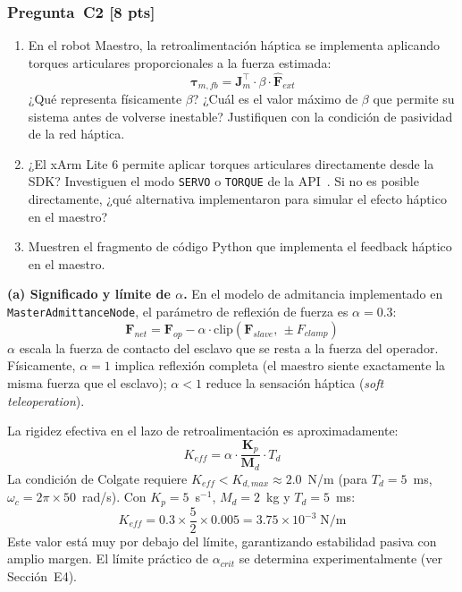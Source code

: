 \documentclass[journal,10pt,twoside]{IEEEtran}
\newcommand{\pts}[1]{\textcolor{tec_red}{\textbf{[#1 pts]}}}
\begin{document}
\subsubsection*{Pregunta~C2 \pts{8}}
\begin{enumerate}[label=(\alph*)]
  \item En el robot Maestro, la retroalimentación háptica se implementa
        aplicando torques articulares proporcionales a la fuerza estimada:
        \[
          \bm{\tau}_{m,fb} = \bm{J}_m^\top \cdot \beta \cdot \hat{\bm{F}}_{ext}
        \]
        ¿Qué representa físicamente $\beta$?
        ¿Cuál es el valor máximo de $\beta$ que permite su sistema
        antes de volverse inestable?
        Justifiquen con la condición de pasividad de la red háptica.
  \item ¿El xArm Lite 6 permite aplicar torques articulares directamente
        desde la SDK? Investiguen el modo \texttt{SERVO} o
        \texttt{TORQUE} de la API~\cite{xarm_github}.
        Si no es posible directamente, ¿qué alternativa implementaron
        para simular el efecto háptico en el maestro?
  \item Muestren el fragmento de código Python que implementa el
        feedback háptico en el maestro.
\end{enumerate}

\textbf{(a) Significado y límite de $\alpha$.}
En el modelo de admitancia implementado en \texttt{MasterAdmittanceNode},
el parámetro de reflexión de fuerza es $\alpha = 0.3$:
\[
  \bm{F}_{net} = \bm{F}_{op} - \alpha \cdot \text{clip}(\bm{F}_{slave},\,
  \pm F_{clamp})
\]
$\alpha$ escala la fuerza de contacto del esclavo que se resta a la
fuerza del operador. Físicamente, $\alpha = 1$ implica reflexión
completa (el maestro siente exactamente la misma fuerza que el esclavo);
$\alpha < 1$ reduce la sensación háptica (\textit{soft teleoperation}).

La rigidez efectiva en el lazo de retroalimentación es aproximadamente:
\[
  K_{eff} = \alpha \cdot \frac{\bm{K}_p}{\bm{M}_d} \cdot T_d
\]
La condición de Colgate requiere $K_{eff} < K_{d,max} \approx 2.0$~N/m
(para $T_d = 5$~ms, $\omega_c = 2\pi\times50$~rad/s). Con
$K_p = 5$~s$^{-1}$, $M_d = 2$~kg y $T_d = 5$~ms:
\[
  K_{eff} = 0.3 \times \frac{5}{2} \times 0.005 = 3.75 \times 10^{-3} \;\text{N/m}
\]
Este valor está muy por debajo del límite, garantizando estabilidad
pasiva con amplio margen. El límite práctico de $\alpha_{crit}$ se
determina experimentalmente (ver Sección~E4).
\end{document}
